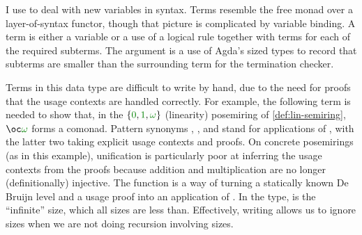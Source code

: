 I use  to deal with new variables in syntax.
Terms resemble the free monad over a layer-of-syntax functor, though
that picture is complicated by variable binding.  A term is either a
variable or a use of a logical rule together with terms for each of
the required subterms.
The  argument  is a use of
Agda's sized types to record that subterms are smaller than the
surrounding term for the termination checker.



Terms in this data type are difficult to write by hand, due to the
need for proofs that the usage contexts are handled correctly. For
example, the following term is needed to show that, in the $\{\gr0,
\gr1, \gr\omega\}$ (linearity) posemiring of \cref{def:lin-semiring},
$\oc\gr\omega$ forms a comonad.
Pattern synonyms ,
, and
 stand for applications of
, with the latter two taking explicit usage
contexts and proofs.
On concrete
posemirings (as in this example), unification is particularly poor at
inferring the usage contexts from the proofs because addition and
multiplication are no longer (definitionally) injective.
The function  is a way of turning a statically known De
Bruijn level and a usage proof into an application of .
In the type, \AgdaPrimitive{$\infty$} is the ``infinite'' size, which all sizes
are less than.
Effectively, writing \AgdaPrimitive{$\infty$} allows us to ignore sizes when we
are not doing recursion involving sizes.


